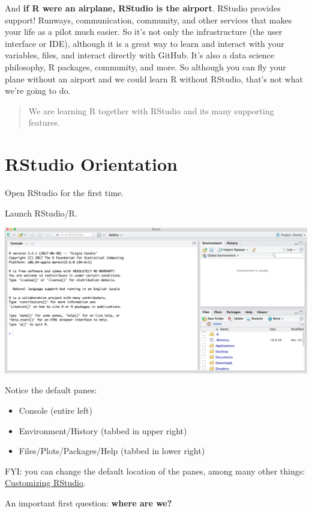 \documentclass[]{book}
\providecommand{\tightlist}{%
  \setlength{\itemsep}{0pt}\setlength{\parskip}{0pt}}
\begin{document}
And \textbf{if R were an airplane, RStudio is the airport}. RStudio provides support! Runways, communication, community, and other services that makes your life as a pilot much easier. So it's not only the infrastructure (the user interface or IDE), although it is a great way to learn and interact with your variables, files, and interact directly with GitHub. It's also a data science philosophy, R packages, community, and more. So although you can fly your plane without an airport and we could learn R without RStudio, that's not what we're going to do.

\begin{quote}
We are learning R together with RStudio and its many supporting features.
\end{quote}

\hypertarget{rstudio-orientation}{%
\section{RStudio Orientation}\label{rstudio-orientation}}

Open RStudio for the first time.

Launch RStudio/R.

\includegraphics[width=0.8\linewidth]{img/RStudio_IDE}

Notice the default panes:

\begin{itemize}
\tightlist
\item
  Console (entire left)
\item
  Environment/History (tabbed in upper right)
\item
  Files/Plots/Packages/Help (tabbed in lower right)
\end{itemize}

FYI: you can change the default location of the panes, among many other things: \href{https://support.rstudio.com/hc/en-us/articles/200549016-Customizing-RStudio}{Customizing RStudio}.

An important first question: \textbf{where are we?}
\end{document}
